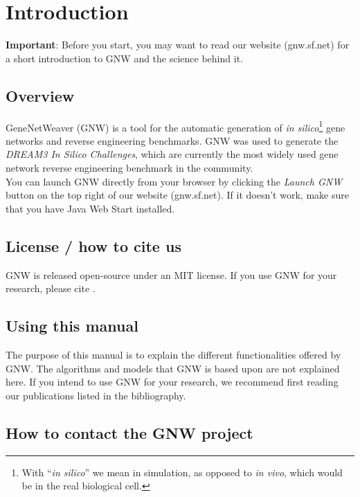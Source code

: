 \documentclass{llncs}
\begin{document}

\section{Introduction}
\textbf{Important}: Before you start, you may want to read our website (gnw.sf.net) for a short introduction to GNW and the science behind it.

\subsection{Overview}

GeneNetWeaver (GNW) is a tool for the automatic generation of \emph{in silico}\footnote{With ``\emph{in silico}'' we mean in simulation, as opposed to \emph{in vivo}, which would be in the real biological cell.} gene networks and reverse engineering benchmarks. GNW was used to generate the \textit{DREAM3 In Silico Challenges}, which are currently the most widely used gene network reverse engineering benchmark in the community.\\

You can launch GNW directly from your browser by clicking the \emph{Launch GNW} button on the top right of our website (gnw.sf.net). If it doesn't work, make sure that you have Java Web Start installed.

\subsection{License / how to cite us}

GNW is released open-source under an MIT license. If you use GNW for your research, please cite \citet{Marbach2009}.

\subsection{Using this manual}

The purpose of this manual is to explain the different functionalities offered by GNW. The algorithms and models that GNW is based upon are not explained here. If you intend to use GNW for your research, we recommend first reading our publications listed in the bibliography.

\subsection{How to contact the GNW project}
\end{document}
